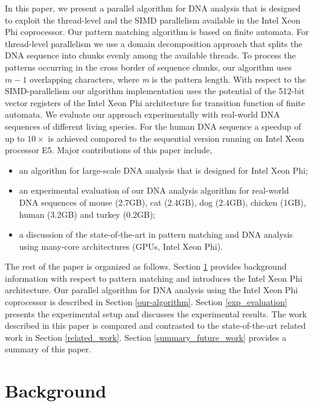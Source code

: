 \documentclass[conference]{IEEEtran}
\begin{document}
In this paper, we present a parallel algorithm for DNA analysis that is designed to exploit the thread-level and the SIMD parallelism available in the Intel Xeon Phi coprocessor. Our pattern matching algorithm is based on finite automata. For thread-level parallelism we use a domain decomposition approach that splits the DNA sequence into chunks evenly among the available threads. To process the patterns occurring in the cross border of sequence chunks, our algorithm uses $m-1$ overlapping characters, where \emph{m} is the pattern length. With respect to the SIMD-parallelism our algorithm implementation uses the potential of the 512-bit vector registers of the Intel Xeon Phi architecture for transition function of finite automata. We evaluate our approach experimentally with real-world DNA sequences of different living species. For the human DNA sequence a speedup of up to $10\times$ is achieved compared to the sequential version running on Intel Xeon processor E5. Major contributions of this paper include,
\begin{itemize}
	\item an algorithm for large-scale DNA analysis that is designed for Intel Xeon Phi;
	\item an experimental evaluation of our DNA analysis algorithm for real-world DNA sequences of mouse (2.7GB), cat (2.4GB), dog (2.4GB), chicken (1GB), human (3.2GB) and turkey (0.2GB);
	\item a discussion of the state-of-the-art in pattern matching and DNA analysis using many-core architectures (GPUs, Intel Xeon Phi).
\end{itemize}




The rest of the paper is organized as follows. Section \ref{background} provides background information with respect to pattern matching and introduces the Intel Xeon Phi architecture. Our parallel algorithm for DNA analysis using the Intel Xeon Phi coprocessor is described in Section \ref{our-algorithm}. Section \ref{exp_evaluation} presents the experimental setup and discusses the experimental results. The work described in this paper is compared and contrasted to the state-of-the-art related work in Section \ref{related_work}. Section \ref{summary_future_work} provides a summary of this paper. 



\section{Background} 
\label{background}
\end{document}
